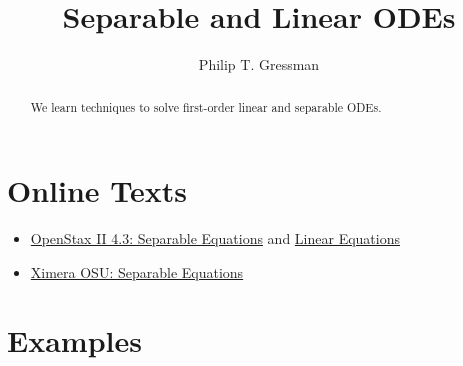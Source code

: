 \documentclass{ximera}
\title{Separable and Linear ODEs}
\author{Philip T. Gressman}
\begin{document}
\begin{abstract}
We learn techniques to solve first-order linear and separable ODEs.
\end{abstract}
\maketitle

\section*{Online Texts}
\begin{itemize}
\item \href{https://openstax.org/books/calculus-volume-2/pages/4-3-separable-equations}{OpenStax II 4.3: Separable Equations} and \href{https://openstax.org/books/calculus-volume-2/pages/4-5-first-order-linear-equations}{Linear Equations}
\item \href{https://ximera.osu.edu/mooculus/calculus2/separableDifferentialEquations/titlePage}{Ximera OSU: Separable Equations}
\end{itemize}

\section*{Examples}

\begin{example}

\end{example}

\begin{example}

\end{example}
\end{document}
